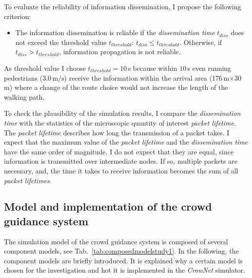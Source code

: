 To evaluate the reliability of information dissemination, I propose the following criterion:
\begin{itemize}
\item The information dissemination is reliable if the \textit{dissemination time} $t_{diss}$ does not exceed the threshold value $t_{threshold}$: $t_{diss}\leq t_{threshold}$. Otherwise, if $t_{diss} > t_{threshold}$, information propagation is not reliable.
\end{itemize}
As threshold value I choose $t_{threshold}=10$\,s because within $10$\,s even running pedestrians ($3.0\,\text{m/s}$) receive the information within the arrival area (176\,m$\times$30\,m) where a change of the route choice would not increase the length of the walking path.

To check the plausibility of the simulation results, I compare the \textit{dissemination time} with the statistics of the microscopic quantity of interest \textit{packet lifetime}. The \textit{packet lifetime} describes how long the transmission of a packet takes. 
I expect that the maximum value of the \textit{packet lifetime} and the \textit{dissemination time} have the same order of magnitude. I do not expect that they are equal, since information is transmitted over intermediate nodes. If so, multiple packets are necessary, and, the time it takes to receive information becomes the sum of all \textit{packet lifetimes}. 





\subsection{Model and implementation of the crowd guidance system}

The simulation model of the crowd guidance system is composed of several component models, see Tab.~\ref{tab:composedmodelstudy1}. In the following, the component models are briefly introduced. It is explained why a certain model is chosen for the investigation and hot it is implemented in the \textit{CrowNet} simulator.

